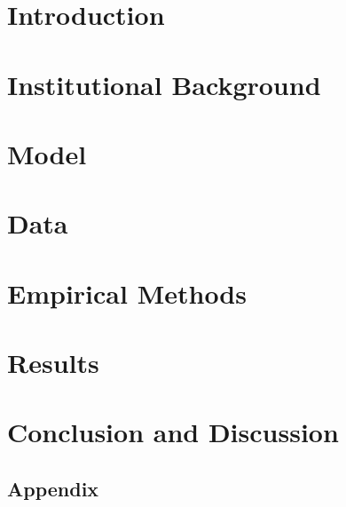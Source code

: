 \documentclass[12pt]{article}%
\begin{document}
\section{Introduction} \label{sec:intro}

\section{Institutional Background} \label{sec:background}

\section{Model} \label{sec:model}

\section{Data} \label{sec:data}
 
\section{Empirical Methods} \label{sec:methods}

\section{Results} \label{sec:results}

\section{Conclusion and Discussion} \label{sec:conclusion}

\FloatBarrier
\newpage
\begin{singlespace}

{}
\end{singlespace}
\FloatBarrier
\newpage
\appendix
\begin{Large}
\section{Appendix}
\end{Large}

\setcounter{table}{0}
\renewcommand{\thetable}{A\arabic{table}}

\begin{appendices}
\end{appendices}
\end{document}
